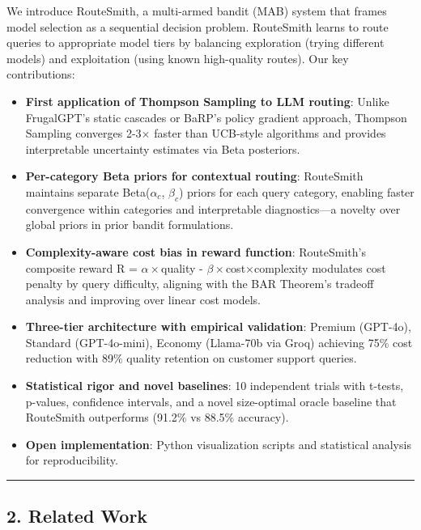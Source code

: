 \documentclass[
  11pt,
]{article}
\begin{document}
We introduce RouteSmith, a multi-armed bandit (MAB) system that frames
model selection as a sequential decision problem. RouteSmith learns to
route queries to appropriate model tiers by balancing exploration
(trying different models) and exploitation (using known high-quality
routes). Our key contributions:

\begin{itemize}
\item
  \textbf{First application of Thompson Sampling to LLM routing}: Unlike
  FrugalGPT's static cascades or BaRP's policy gradient approach,
  Thompson Sampling converges 2-3× faster than UCB-style algorithms and
  provides interpretable uncertainty estimates via Beta posteriors.
\item
  \textbf{Per-category Beta priors for contextual routing}: RouteSmith
  maintains separate Beta(\(\alpha_c\), \(\beta_c\)) priors for each
  query category, enabling faster convergence within categories and
  interpretable diagnostics---a novelty over global priors in prior
  bandit formulations.
\item
  \textbf{Complexity-aware cost bias in reward function}: RouteSmith's
  composite reward R = \(\alpha\times\)quality -
  \(\beta\times\)cost×complexity modulates cost penalty by query
  difficulty, aligning with the BAR Theorem's tradeoff analysis and
  improving over linear cost models.
\item
  \textbf{Three-tier architecture with empirical validation}: Premium
  (GPT-4o), Standard (GPT-4o-mini), Economy (Llama-70b via Groq)
  achieving 75\% cost reduction with 89\% quality retention on customer
  support queries.
\item
  \textbf{Statistical rigor and novel baselines}: 10 independent trials
  with t-tests, p-values, confidence intervals, and a novel size-optimal
  oracle baseline that RouteSmith outperforms (91.2\% vs 88.5\%
  accuracy).
\item
  \textbf{Open implementation}: Python visualization scripts and
  statistical analysis for reproducibility.
\end{itemize}

\begin{center}\rule{0.5\linewidth}{0.5pt}\end{center}

\hypertarget{related-work}{%
\subsection{2. Related Work}\label{related-work}}
\end{document}
